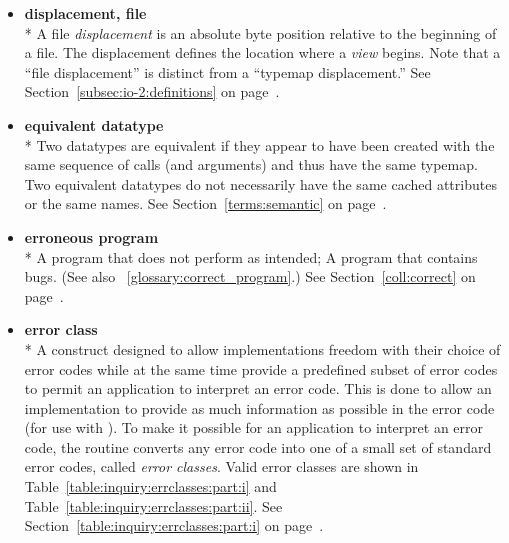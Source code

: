 \begin{itemize}
\label{glossary:displacement, file}
\item \textbf{ displacement, file} \\*
A file {\it displacement} is an absolute byte position
relative to the beginning of a file.
The displacement defines the location where a {\it view} begins.
Note that a ``file displacement'' is distinct from a ``typemap displacement.''
See Section~\ref{subsec:io-2:definitions} on page~\pageref{subsec:io-2:definitions}.

\label{glossary:equivalent datatype}
\item \textbf{ equivalent datatype} \\*
Two datatypes are equivalent if they appear to have been created with
the same sequence of calls (and arguments) and thus have the same
typemap.  Two equivalent datatypes do not necessarily have the same
cached attributes or the same names.
See Section~\ref{terms:semantic} on page~\pageref{terms:semantic}.

\label{glossary:erroneous_program}
\item \textbf{ erroneous program} \\*
A program that does not perform as intended; A program that contains bugs. 
(See also ~\ref{glossary:correct_program}.)
See Section~\ref{coll:correct} on page~\pageref{coll:correct}.

\label{glossary:error_class}
\item \textbf{ error class} \\*
A construct designed to allow implementations freedom with their choice
of error codes while at the same time provide a predefined subset of error
codes to permit an application to interpret an error code.
This is done to allow an implementation to
provide as much information as possible in the error code (for use with
).
To make it possible for an application to interpret an error code, the routine
converts any error code into one of a small set of standard error
codes, called {\em error classes}.  
Valid error classes are shown in Table~\ref{table:inquiry:errclasses:part:i}
and Table~\ref{table:inquiry:errclasses:part:ii}. 
See Section~\ref{table:inquiry:errclasses:part:i} on page~\pageref{table:inquiry:errclasses:part:i}.


\end{itemize}
